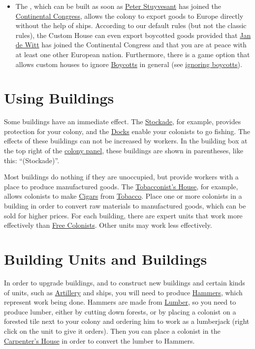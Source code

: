 \documentclass[12pt]{book}
\begin{document}
\begin{itemize}
\item The , which can be built as soon as
  \hyperlink{Peter Stuyvesant}{Peter Stuyvesant} has joined the
  \hyperlink{Continental Congress}{Continental Congress}, allows the
  colony to export goods to Europe directly without the help of
  ships. According to our default rules (but not the classic rules),
  the Custom House can even export boycotted goods provided that
  \hyperlink{Jan de Witt}{Jan de Witt} has joined the Continental
  Congress and that you are at peace with at least one other European
  nation. Furthermore, there is a game option that allows custom
  houses to ignore \hyperlink{Boycotts}{Boycotts} in general (see
  \hyperlink{ignore boycotts}{ignoring boycotts}).

\end{itemize}


\hypertarget{Using Buildings}{\section{{Using Buildings}}}

Some buildings have an immediate effect. The
\hyperlink{Stockade}{Stockade}, for example, provides protection for
your colony, and the \hyperlink{Dock}{Docks} enable your colonists to
go fishing. The effects of these buildings can not be increased by
workers. In the building box at the top right of the \hyperlink{colony
panel}{colony panel}, these buildings are shown in parentheses, like
this: ``(Stockade)''.

Most buildings do nothing if they are unoccupied, but provide workers
with a place to produce manufactured goods. The
\hyperlink{Tobacconist's House}{Tobacconist's House}, for example,
allows colonists to make \hyperlink{Cigars}{Cigars} from
\hyperlink{Tobacco}{Tobacco}. Place one or more colonists in a
building in order to convert raw materials to manufactured goods,
which can be sold for higher prices. For each building, there are
expert units that work more effectively than \hyperlink{Free
  Colonist}{Free Colonists}. Other units may work less effectively.


\hypertarget{Building Units and Buildings}{\section{Building Units 
and Buildings}}

In order to upgrade buildings, and to construct new buildings and
certain kinds of units, such as \hyperlink{Artillery}{Artillery} and
ships, you will need to produce \hyperlink{Hammers}{Hammers}, which
represent work being done. Hammers are made from
\hyperlink{Lumber}{Lumber}, so you need to produce lumber, either by
cutting down forests, or by placing a colonist on a forested tile next
to your colony and ordering him to work as a lumberjack (right click
on the unit to give it orders). Then you can place a colonist in the
\hyperlink{Carpenter's House}{Carpenter's House} in order to convert
the lumber to Hammers.
\end{document}
